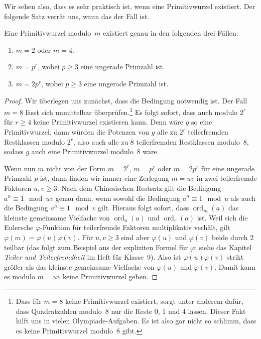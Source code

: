 Wir sehen also, dass es sehr praktisch ist, wenn eine Primitivwurzel existiert. Der folgende Satz verrät uns, wann das der Fall ist.
\begin{satzmitnamen}
	Eine Primitivwurzel modulo~$m$ existiert genau in den folgenden drei Fällen:
	\begin{enumerate}[label={$(\alph*)$},ref={$(\alph*)$}]
		\item $m=2$ oder $m=4$.
		\item $m=p^r$, wobei $p\geqslant 3$ eine ungerade Primzahl ist.\label{fall:Primpotenz}
		\item $m=2p^r$, wobei $p\geqslant 3$ eine ungerade Primzahl ist.\label{fall:DoppeltePrimpotenz}
	\end{enumerate}
\end{satzmitnamen}
\begin{proof}
	Wir überlegen uns zunächst, dass die Bedingung notwendig ist. Der Fall $m=8$ lässt sich unmittelbar überprüfen.\footnote{Dass für $m=8$ keine Primitivwurzel existiert, sorgt unter anderem dafür, dass Quadratzahlen modulo~$8$ nur die Reste $0$, $1$ und $4$ lassen. Dieser Fakt hilft uns in vielen Olympiade-Aufgaben. Es ist also gar nicht so schlimm, dass es keine Primitivwurzel modulo~$8$ gibt.} Es folgt sofort, dass auch modulo $2^r$ für $r\geqslant 4$ keine Primitivwurzel existieren kann. Denn wäre $g$ so eine Primitivwurzel, dann würden die Potenzen von $g$ alle zu $2^r$ teilerfremden Restklassen modulo $2^r$, also auch alle zu $8$ teilerfremden Restklassen modulo~$8$, sodass $g$ auch eine Primitivwurzel modulo~$8$ wäre.
	
	Wenn nun $m$ nicht von der Form $m=2^r$, $m=p^r$ oder $m=2p^r$ für eine ungerade Primzahl $p$ ist, dann finden wir immer eine Zerlegung $m=uv$ in zwei teilerfremde Faktoren $u,v\geqslant 3$. Nach dem Chinesischen Restsatz gilt die Bedingung $a^n\equiv 1\mod uv$ genau dann, wenn sowohl die Bedingung $a^n\equiv 1\mod u$ als auch die Bedingung $a^n\equiv 1\mod v$ gilt. Hieraus folgt sofort, dass $\operatorname{ord}_m(a)$ das kleinste gemeinsame Vielfache von $\operatorname{ord}_u(a)$ und $\operatorname{ord}_v(a)$ ist. Weil sich die Eulersche $\varphi$-Funktion für teilerfremde Faktoren multiplikativ verhält, gilt $\varphi(m)=\varphi(u)\varphi(v)$. Für $u,v\geqslant 3$ sind aber $\varphi(u)$ und $\varphi(v)$ beide durch $2$ teilbar (das folgt zum Beispiel aus der expliziten Formel für $\varphi$; siehe das Kapitel \emph{Teiler und Teilerfremdheit} im Heft für Klasse~9). Also ist $\varphi(u)\varphi(v)$ strikt größer als das kleinste gemeinsame Vielfache von $\varphi(u)$ und $\varphi(v)$. Damit kann es modulo $m=uv$ keine Primitivwurzel geben.
	

\end{proof}

